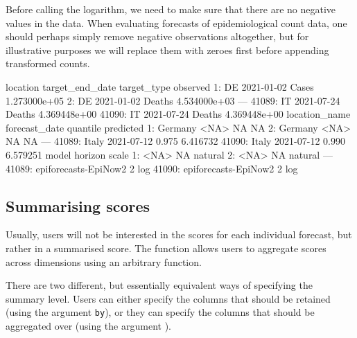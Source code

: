 \documentclass[
]{jss}
\begin{document}
Before calling the logarithm, we need to make sure that there are no
negative values in the data. When evaluating forecasts of
epidemiological count data, one should perhaps simply remove negative
observations altogether, but for illustrative purposes we will replace
them with zeroes first before appending transformed counts.

\begin{CodeChunk}
\begin{CodeOutput}
       location target_end_date target_type     observed
    1:       DE      2021-01-02       Cases 1.273000e+05
    2:       DE      2021-01-02      Deaths 4.534000e+03
   ---                                                  
41089:       IT      2021-07-24      Deaths 4.369448e+00
41090:       IT      2021-07-24      Deaths 4.369448e+00
       location_name forecast_date quantile predicted
    1:       Germany          <NA>       NA        NA
    2:       Germany          <NA>       NA        NA
   ---                                               
41089:         Italy    2021-07-12    0.975  6.416732
41090:         Italy    2021-07-12    0.990  6.579251
                      model horizon   scale
    1:                 <NA>      NA natural
    2:                 <NA>      NA natural
   ---                                     
41089: epiforecasts-EpiNow2       2     log
41090: epiforecasts-EpiNow2       2     log
\end{CodeOutput}
\end{CodeChunk}

\subsection{Summarising scores}\label{summarising-scores}

Usually, users will not be interested in the scores for each individual
forecast, but rather in a summarised score. The function
 allows users to aggregate scores across
dimensions using an arbitrary function.

There are two different, but essentially equivalent ways of specifying
the summary level. Users can either specify the columns that should be
retained (using the argument \texttt{by}), or they can specify the
columns that should be aggregated over (using the argument
).
\end{document}
